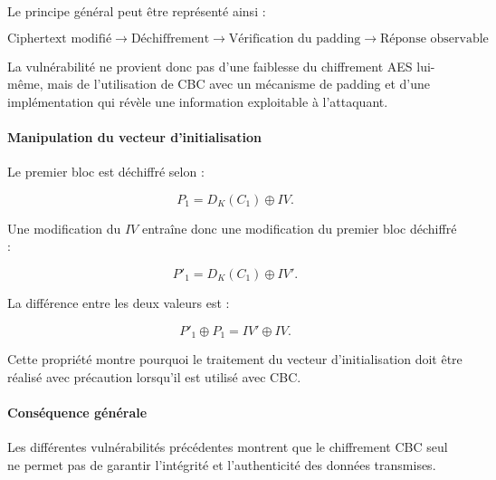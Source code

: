 \documentclass[12pt,a4paper]{article}
\begin{document}
Le principe général peut être représenté ainsi :

\[
\text{Ciphertext modifié}
\longrightarrow
\text{Déchiffrement}
\longrightarrow
\text{Vérification du padding}
\longrightarrow
\text{Réponse observable}
\]

La vulnérabilité ne provient donc pas d'une faiblesse du chiffrement
AES lui-même, mais de l'utilisation de CBC avec un mécanisme de
padding et d'une implémentation qui révèle une information exploitable
à l'attaquant.


\paragraph{Manipulation du vecteur d'initialisation}

Le premier bloc est déchiffré selon :

\[
P_1 = D_K(C_1) \oplus IV.
\]

Une modification du $IV$ entraîne donc une modification du premier
bloc déchiffré :

\[
P'_1 = D_K(C_1) \oplus IV'.
\]

La différence entre les deux valeurs est :

\[
P'_1 \oplus P_1 = IV' \oplus IV.
\]

Cette propriété montre pourquoi le traitement du vecteur
d'initialisation doit être réalisé avec précaution lorsqu'il est utilisé
avec CBC.


\paragraph{Conséquence générale}

Les différentes vulnérabilités précédentes montrent que le chiffrement
CBC seul ne permet pas de garantir l'intégrité et l'authenticité des
données transmises.
\end{document}
